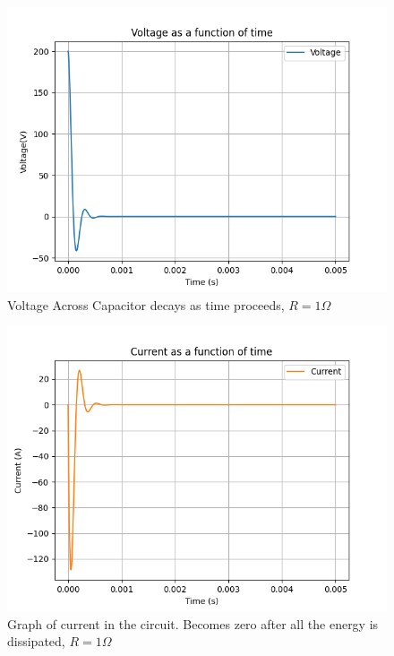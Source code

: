 \documentclass[journal,12pt,twocolumn]{IEEEtran}
\theoremstyle{remark}
\begin{document}
\begin{figure}[H]
    \includegraphics[width=1\columnwidth]{figs/Voltage across capacitor during Damping.png }
    \caption{Voltage Across Capacitor decays as time proceeds, $R=1\Omega$}
    \label{fig:charge_during_damping}
\end{figure}

\begin{figure}[H]
    \includegraphics[width=1\columnwidth]{figs/Current in circuit during damping.png}
    \caption{Graph of current in the circuit. Becomes zero after all the energy is dissipated, $R=1\Omega$}
    \label{fig:current_in_damping}
\end{figure}
\end{document}
